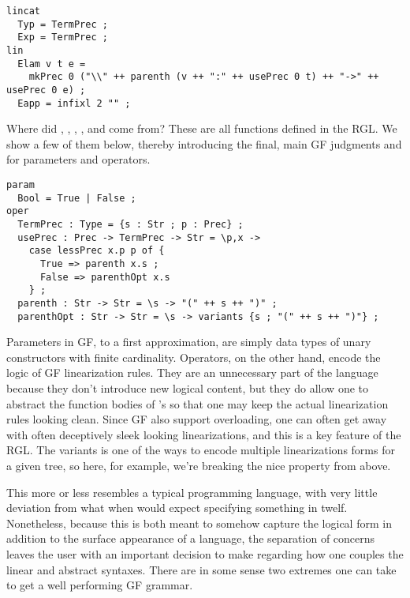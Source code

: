 \begin{verbatim}
lincat
  Typ = TermPrec ;
  Exp = TermPrec ;
lin
  Elam v t e = 
    mkPrec 0 ("\\" ++ parenth (v ++ ":" ++ usePrec 0 t) ++ "->" ++ usePrec 0 e) ;
  Eapp = infixl 2 "" ;
\end{verbatim}

Where did , , , , and
 come from? These are all functions defined in the RGL. We show a
few of them below, thereby introducing the final, main GF judgments 
and  for parameters and operators.

\begin{verbatim}
param 
  Bool = True | False ;
oper
  TermPrec : Type = {s : Str ; p : Prec} ;
  usePrec : Prec -> TermPrec -> Str = \p,x ->
    case lessPrec x.p p of {
      True => parenth x.s ;
      False => parenthOpt x.s
    } ;
  parenth : Str -> Str = \s -> "(" ++ s ++ ")" ;
  parenthOpt : Str -> Str = \s -> variants {s ; "(" ++ s ++ ")"} ;
\end{verbatim}

Parameters in GF, to a first approximation, are simply data types of unary
constructors with finite cardinality. Operators, on the other hand, encode the
logic of GF linearization rules. They are an unnecessary part of the language
because they don't introduce new logical content, but they do allow one to
abstract the function bodies of 's so that one may keep the actual
linearization rules looking clean. Since GF also support 
overloading, one can often get away with often deceptively sleek looking
linearizations, and this is a key feature of the RGL. The variants is one of the
ways to encode multiple linearizations forms for a given tree, so here, for
example, we're breaking the nice property from above.

This more or less resembles a typical programming language, with very little
deviation from what when would expect specifying something in twelf.
Nonetheless, because this is both meant to somehow capture the logical form in
addition to the surface appearance of a language, the separation of concerns
leaves the user with an important decision to make regarding how one couples the
linear and abstract syntaxes. There are in some sense two extremes one can take
to get a well performing GF grammar.

